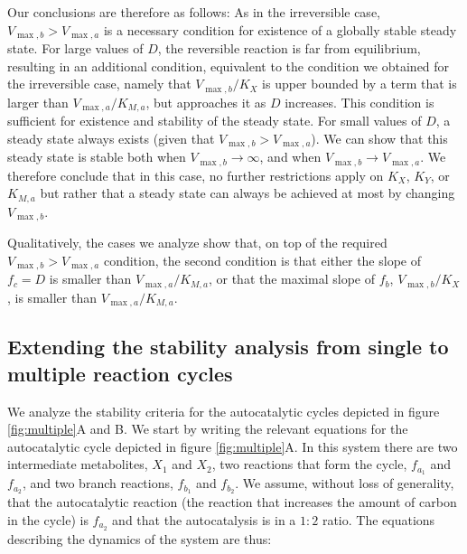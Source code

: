 Our conclusions are therefore as follows:
As in the irreversible case, $V_{\max,b}>V_{\max,a}$ is a necessary condition for existence of a globally stable steady state.
For large values of $D$, the reversible reaction is far from equilibrium, resulting in an additional condition, equivalent to the condition we obtained for the irreversible case, namely that $V_{\max,b}/K_X$ is upper bounded by a term that is larger than $V_{\max,a}/K_{M,a}$, but approaches it as $D$ increases.
This condition is sufficient for existence and stability of the steady state.
For small values of $D$, a steady state always exists (given that $V_{\max,b}>V_{\max,a}$).
We can show that this steady state is stable both when $V_{\max,b}\rightarrow \infty$, and when $V_{\max,b}\rightarrow V_{\max,a}$.
We therefore conclude that in this case, no further restrictions apply on $K_X$, $K_Y$, or $K_{M,a}$ but rather that a steady state can always be achieved at most by changing $V_{\max,b}$.

Qualitatively, the cases we analyze show that, on top of the required $V_{\max,b}>V_{\max,a}$ condition, the second condition is that either the slope of $f_c=D$ is smaller than $V_{\max,a}/K_{M,a}$, or that the maximal slope of $f_b$, $V_{\max,b}/K_X$, is smaller than $V_{\max,a}/K_{M,a}$.
  \label{sec:reversiblebranch}
\subsection{Extending the stability analysis from single to multiple reaction cycles}
    We analyze the stability criteria for the autocatalytic cycles depicted in figure \ref{fig:multiple}A and B.
    We start by writing the relevant equations for the autocatalytic cycle depicted in figure \ref{fig:multiple}A.
    In this system there are two intermediate metabolites, $X_1$ and $X_2$, two reactions that form the cycle, $f_{a_1}$ and $f_{a_2}$, and two branch reactions, $f_{b_1}$ and $f_{b_2}$.
    We assume, without loss of generality, that the autocatalytic reaction (the reaction that increases the amount of carbon in the cycle) is $f_{a_2}$ and that the autocatalysis is in a $1\mathbin{:}2$ ratio.
    The equations describing the dynamics of the system are thus:

